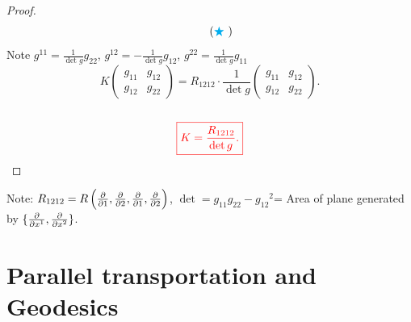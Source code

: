 \begin{proof}
\[        \tag{\(\textcolor{cyan}{\bigstar}\) }
    \]
    Note \(g^{11}=\frac{1}{\det g}g_{22}\), \(g^{12}=-\frac{1}{\det g}
    g_{12}\), \(g^{22}=\frac{1}{\det g}g_{11}\)
    \[
        K\begin{pmatrix}
            g_{11}& g_{12}\\
            g_{12} & g_{22}
        \end{pmatrix}
        =R_{1212}\cdot\frac{1}{\det g}
        \begin{pmatrix}
            g_{11}& g_{12}\\
            g_{12} & g_{22}
        \end{pmatrix}.
    \]
    \ie\ 
    \[
        \textcolor{red}{
            \boxed{K=\frac{R_{1212}}{\det g}.}
        }    
    \]
\end{proof}
Note: \(R_{1212}=R\left(\pdv{1},\pdv{2},\pdv{1},\pdv{2}\right)\), 
\(\det= g_{11}g_{22}-{g_{12}}^2\)= Area of plane generated by
\(\{\pdv{x^1},\pdv{x^2}\}\).
\section{Parallel transportation and Geodesics}
